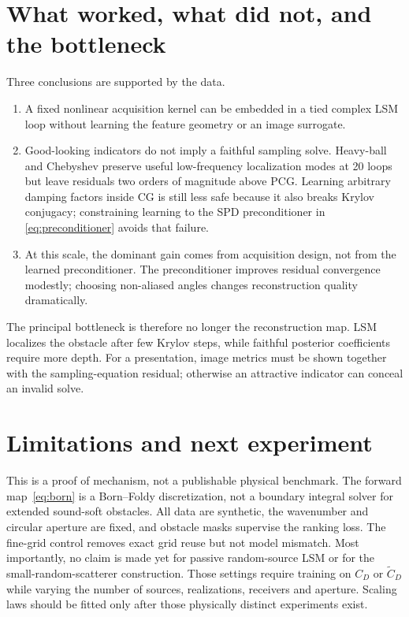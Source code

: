 \documentclass[10pt]{article}
\begin{document}
\section{What worked, what did not, and the bottleneck}

Three conclusions are supported by the data.
\begin{enumerate}
\item A fixed nonlinear acquisition kernel can be embedded in a tied complex
LSM loop without learning the feature geometry or an image surrogate.
\item Good-looking indicators do not imply a faithful sampling solve.
Heavy-ball and Chebyshev preserve useful low-frequency localization modes at
20 loops but leave residuals two orders of magnitude above PCG.  Learning
arbitrary damping factors inside CG is still less safe because it also breaks
Krylov conjugacy; constraining learning to the SPD preconditioner in
\eqref{eq:preconditioner} avoids that failure.
\item At this scale, the dominant gain comes from acquisition design, not from
the learned preconditioner.  The preconditioner improves residual convergence
modestly; choosing non-aliased angles changes reconstruction quality
dramatically.
\end{enumerate}

The principal bottleneck is therefore no longer the reconstruction map.  LSM
localizes the obstacle after few Krylov steps, while faithful posterior
coefficients require more depth.  For a presentation, image metrics must be
shown together with the sampling-equation residual; otherwise an attractive
indicator can conceal an invalid solve.

\section{Limitations and next experiment}

This is a proof of mechanism, not a publishable physical benchmark.  The
forward map~\eqref{eq:born} is a Born--Foldy discretization, not a boundary
integral solver for extended sound-soft obstacles.  All data are synthetic,
the wavenumber and circular aperture are fixed, and obstacle masks supervise
the ranking loss.  The fine-grid control removes exact grid reuse but not model
mismatch.  Most importantly, no claim is made yet for passive random-source
LSM or for the small-random-scatterer construction.  Those settings require
training on $C_D$ or $\widetilde C_D$ while varying the number of sources,
realizations, receivers and aperture.  Scaling laws should be fitted only
after those physically distinct experiments exist.
\end{document}
